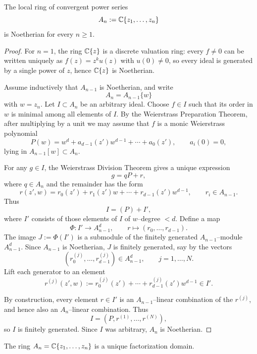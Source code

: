 \documentclass[12pt]{article}
\begin{document}
\begin{theorem}
The local ring of convergent power series 
\[
A_n := \mathbb{C}\{z_1,\dots,z_n\}
\]
is Noetherian for every $n\ge 1$.
\end{theorem}

\begin{proof}
For $n=1$, the ring $\mathbb{C}\{z\}$ is a discrete valuation ring: every
$f\neq 0$ can be written uniquely as $f(z)=z^k u(z)$ with $u(0)\neq 0$,
so every ideal is generated by a single power of $z$, hence $\mathbb{C}\{z\}$ is
Noetherian.

Assume inductively that $A_{n-1}$ is Noetherian, and write
\[
A_n = A_{n-1}\{w\}
\]
with $w=z_n$. Let $I\subset A_n$ be an arbitrary ideal. Choose
$f\in I$ such that its order in $w$ is minimal among all elements of $I$.
By the Weierstrass Preparation Theorem, after multiplying by a unit we may
assume that $f$ is a monic Weierstrass polynomial
\[
P(w) = w^d + a_{d-1}(z') w^{d-1} + \cdots + a_0(z'),
\qquad a_i(0)=0,
\]
lying in $A_{n-1}[w]\subset A_n$.

For any $g\in I$, the Weierstrass Division Theorem gives a unique
expression
\[
g = qP + r,
\]
where $q\in A_n$ and the remainder has the form
\[
r(z',w) = r_0(z') + r_1(z')w + \cdots + r_{d-1}(z')w^{d-1},
\qquad r_i \in A_{n-1}.
\]
Thus
\[
I = (P) + I',
\]
where $I'$ consists of those elements of $I$ of $w$--degree $<d$.
Define a map
\[
\Phi : I' \longrightarrow A_{n-1}^d,\qquad
r \longmapsto (r_0,\dots,r_{d-1}).
\]
The image $J:=\Phi(I')$ is a submodule of the finitely generated
$A_{n-1}$--module $A_{n-1}^d$. Since $A_{n-1}$ is Noetherian, $J$ is
finitely generated, say by the vectors
\[
(r_0^{(j)},\dots,r_{d-1}^{(j)}) \in A_{n-1}^d,
\qquad j=1,\dots,N.
\]
Lift each generator to an element
\[
r^{(j)}(z',w)
:= r_0^{(j)}(z') + \cdots + r_{d-1}^{(j)}(z') w^{d-1}
\in I'.
\]

By construction, every element $r\in I'$ is an $A_{n-1}$--linear
combination of the $r^{(j)}$, and hence also an $A_n$--linear combination.
Thus
\[
I = (P, r^{(1)},\dots,r^{(N)}),
\]
so $I$ is finitely generated. Since $I$ was arbitrary, $A_n$ is Noetherian.
\end{proof}

\begin{theorem}
The ring $A_n = \mathbb{C}\{z_1,\dots,z_n\}$ is a unique factorization domain.
\end{theorem}
\end{document}
